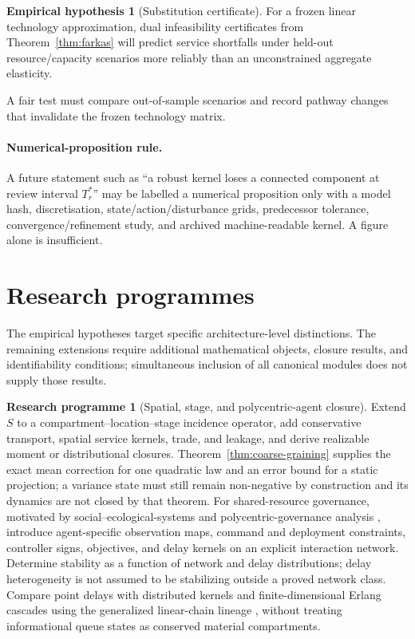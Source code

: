 \documentclass[11pt]{article}
\theoremstyle{definition}
\newtheorem{hypothesis}{Empirical hypothesis}
\newtheorem{programme}{Research programme}
\begin{document}
\begin{hypothesis}[Substitution certificate]
For a frozen linear technology approximation, dual infeasibility certificates from Theorem~\ref{thm:farkas} will predict service shortfalls under held-out resource/capacity scenarios more reliably than an unconstrained aggregate elasticity.
\end{hypothesis}

A fair test must compare out-of-sample scenarios and record pathway changes that invalidate the frozen technology matrix.

\paragraph{Numerical-proposition rule.}
A future statement such as ``a robust kernel loses a connected component at review interval $T_r^*$'' may be labelled a numerical proposition only with a model hash, discretisation, state/action/disturbance grids, predecessor tolerance, convergence/refinement study, and archived machine-readable kernel. A figure alone is insufficient.

\section{Research programmes}

The empirical hypotheses target specific architecture-level distinctions. The remaining extensions require additional mathematical objects, closure results, and identifiability conditions; simultaneous inclusion of all canonical modules does not supply those results.

\begin{programme}[Spatial, stage, and polycentric-agent closure]
Extend $S$ to a compartment--location--stage incidence operator, add conservative transport, spatial service kernels, trade, and leakage, and derive realizable moment or distributional closures. Theorem~\ref{thm:coarse-graining} supplies the exact mean correction for one quadratic law and an error bound for a static projection; a variance state must still remain non-negative by construction and its dynamics are not closed by that theorem. For shared-resource governance, motivated by social--ecological-systems and polycentric-governance analysis \cite{ostrom2009}, introduce agent-specific observation maps, command and deployment constraints, controller signs, objectives, and delay kernels on an explicit interaction network. Determine stability as a function of network and delay distributions; delay heterogeneity is not assumed to be stabilizing outside a proved network class. Compare point delays with distributed kernels and finite-dimensional Erlang cascades using the generalized linear-chain lineage \cite{hurtado2019}, without treating informational queue states as conserved material compartments.
\end{programme}
\end{document}
